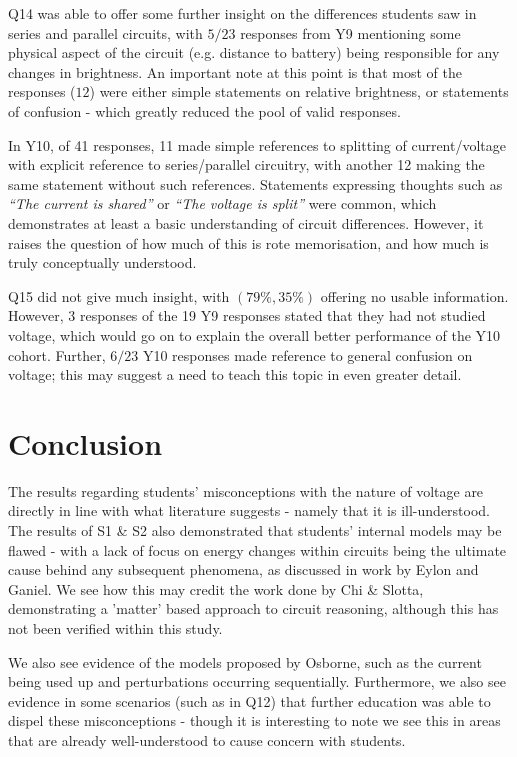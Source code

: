 \documentclass[a4paper,openany,nobib]{tufte-book}
\begin{document}

Q14 was able to offer some further insight on the differences students saw in series and parallel circuits, with $5/23 $ responses from Y9 mentioning some physical aspect of the circuit (e.g. distance to battery) being responsible for any changes in brightness. An important note at this point is that most of the responses ($12$) were either simple statements on relative brightness, or statements of confusion - which greatly reduced the pool of valid responses.

In Y10, of 41 responses, 11 made simple references to splitting of current/voltage with explicit reference to series/parallel circuitry, with another 12 making the same statement without such references. Statements expressing thoughts such as \emph{``The current is shared''} or \emph{``The voltage is split''} were common, which demonstrates at least a basic understanding of circuit differences. However, it raises the question of how much of this is rote memorisation, and how much is truly conceptually understood.

Q15 did not give much insight, with $(79\%,35\%)$ offering no usable information. However, 3 responses of the 19 Y9 responses stated that they had not studied voltage, which would go on to explain the overall better performance of the Y10 cohort. Further, $6/23$ Y10 responses made reference to general confusion on voltage; this may suggest a need to teach this topic in even greater detail.
\chapter{Conclusion}%

The results regarding students' misconceptions with the nature of voltage are directly in line with what literature suggests - namely that it is ill-understood. The results of S1 \& S2 also demonstrated that students' internal models may be flawed - with a lack of focus on energy changes within circuits being the ultimate cause behind any subsequent phenomena, as discussed in work by Eylon and Ganiel. We see how this may credit the work done by Chi \& Slotta, demonstrating a 'matter' based approach to circuit reasoning, although this has not been verified within this study.

We also see evidence of the models proposed by Osborne, such as the current being used up and perturbations occurring sequentially. Furthermore, we also see evidence in some scenarios (such as in Q12) that further education was able to dispel these misconceptions - though it is interesting to note we see this in areas that are already well-understood to cause concern with students.
\end{document}
